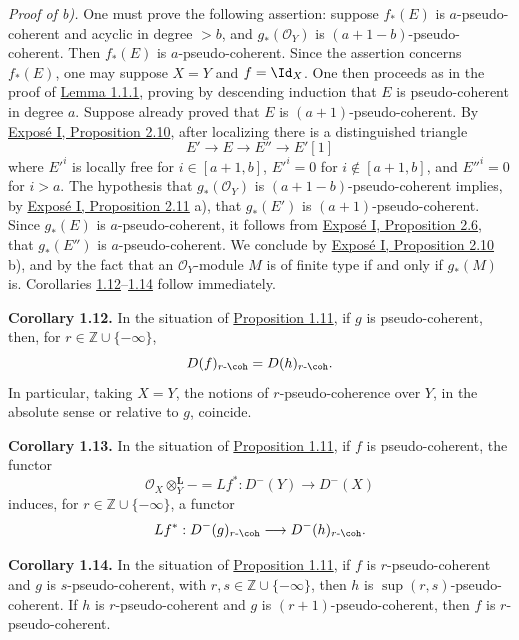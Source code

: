 \emph{Proof of b).} One must prove the following assertion: suppose \(f_*(E)\) is \(a\)-pseudo-coherent and acyclic in degree \(>b\), and \(g_*(\mathcal O_Y)\) is \((a+1-b)\)-pseudo-coherent. Then \(f_*(E)\) is \(a\)-pseudo-coherent. Since the assertion concerns \(f_*(E)\), one may suppose \(X=Y\) and \(f=\Id_X\). One then proceeds as in the proof of \hyperlink{sga6.e03.lem.1-1-1}{Lemma 1.1.1}, proving by descending induction that \(E\) is pseudo-coherent in degree \(a\). Suppose already proved that \(E\) is \((a+1)\)-pseudo-coherent. By \hyperlink{sga6.e01.prop.2-10}{Exposé I, Proposition 2.10}, after localizing there is a distinguished triangle
\[
E'\longrightarrow E\longrightarrow E''\longrightarrow E'[1]
\]
where \(E'^i\) is locally free for \(i\in [a+1,b]\), \(E'^i=0\) for \(i\notin [a+1,b]\), and \(E''^i=0\) for \(i>a\). The hypothesis that \(g_*(\mathcal O_Y)\) is \((a+1-b)\)-pseudo-coherent implies, by \hyperlink{sga6.e01.prop.2-11}{Exposé I, Proposition 2.11} a), that \(g_*(E')\) is \((a+1)\)-pseudo-coherent. Since \(g_*(E)\) is \(a\)-pseudo-coherent, it follows from \hyperlink{sga6.e01.schol.2-6}{Exposé I, Proposition 2.6}, that \(g_*(E'')\) is \(a\)-pseudo-coherent. We conclude by \hyperlink{sga6.e01.prop.2-10}{Exposé I, Proposition 2.10} b), and by the fact that an \(\mathcal O_Y\)-module \(M\) is of finite type if and only if \(g_*(M)\) is. Corollaries \hyperlink{sga6.e03.cor.1-12}{1.12}--\hyperlink{sga6.e03.cor.1-14}{1.14} follow immediately.

\textbf{Corollary 1.12.} In the situation of \hyperlink{sga6.e03.prop.1-11}{Proposition 1.11}, if \(g\) is pseudo-coherent, then, for \(r\in\mathbb Z\cup\{-\infty\}\),
\[
  D(f)_{r\text{-}\coh}=D(h)_{r\text{-}\coh}.
\]
In particular, taking \(X=Y\), the notions of \(r\)-pseudo-coherence over \(Y\), in the absolute sense or relative to \(g\), coincide.

\textbf{Corollary 1.13.} In the situation of \hyperlink{sga6.e03.prop.1-11}{Proposition 1.11}, if \(f\) is pseudo-coherent, the functor
\[
  \mathcal O_X\otimes_Y^{\mathbf L}-=Lf^*:D^{-}(Y)\longrightarrow D^{-}(X)
\]
induces, for \(r\in\mathbb Z\cup\{-\infty\}\), a functor
\[
  Lf^*:D^{-}(g)_{r\text{-}\coh}\longrightarrow D^{-}(h)_{r\text{-}\coh}.
\]

\textbf{Corollary 1.14.} In the situation of \hyperlink{sga6.e03.prop.1-11}{Proposition 1.11}, if \(f\) is \(r\)-pseudo-coherent and \(g\) is \(s\)-pseudo-coherent, with \(r,s\in\mathbb Z\cup\{-\infty\}\), then \(h\) is \(\sup(r,s)\)-pseudo-coherent. If \(h\) is \(r\)-pseudo-coherent and \(g\) is \((r+1)\)-pseudo-coherent, then \(f\) is \(r\)-pseudo-coherent.

